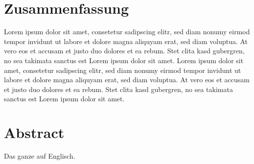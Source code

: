 \documentclass[12pt,a4paper,bibliography=totocnumbered,listof=totocnumbered]{scrartcl}
\begin{document}
\setcounter{page}{1}
\onehalfspacing
{}
\section{Zusammenfassung}

Lorem ipsum dolor sit amet, consetetur sadipscing elitr, sed diam nonumy eirmod tempor invidunt ut labore et dolore magna aliquyam erat, sed diam voluptua. At vero eos et accusam et justo duo dolores et ea rebum. Stet clita kasd gubergren, no sea takimata sanctus est Lorem ipsum dolor sit amet. Lorem ipsum dolor sit amet, consetetur sadipscing elitr, sed diam nonumy eirmod tempor invidunt ut labore et dolore magna aliquyam erat, sed diam voluptua. At vero eos et accusam et justo duo dolores et ea rebum. Stet clita kasd gubergren, no sea takimata sanctus est Lorem ipsum dolor sit amet.

\vspace{-1,2em}
\section*{Abstract}
Das ganze auf Englisch.
\pagebreak

\renewcommand{\cfttabpresnum}{Tab. }
\renewcommand{\cftfigpresnum}{Abb. }
\settowidth{\cfttabnumwidth}{Abb. 10\quad}
\settowidth{\cftfignumwidth}{Abb. 10\quad}

\singlespacing
{}
\renewcommand{\contentsname}{II Inhaltsverzeichnis}
{}
\addtocounter{section}{1}
\tableofcontents
\pagebreak
{}
\listoffigures
\pagebreak
\listoftables
\pagebreak
\renewcommand{\lstlistlistingname}{Listing-Verzeichnis}
{\lstlistoflistings}
\pagebreak
\end{document}

